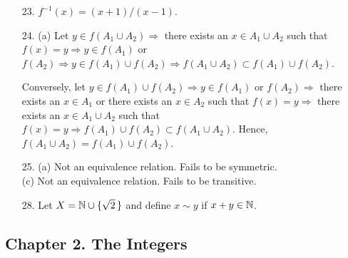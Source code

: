 {\begin{itemize}
\item[23.]
$f^{-1}(x) = (x+1)/(x-1)$.
 
\item[24.]
(a)  Let $y \in f(A_1 \cup A_2) \Rightarrow$ there exists an $x
\in A_1 \cup A_2$ such that $f(x) = y \Rightarrow y \in f(A_1)$ or
$f(A_2) \Rightarrow y \in f(A_1) \cup f(A_2) \Rightarrow f(A_1 \cup A_2)
\subset f(A_1) \cup f(A_2)$.
 
Conversely, let $y \in f(A_1) \cup f(A_2) \Rightarrow y \in f(A_1)$ or
$f(A_2) \Rightarrow$ there exists an $x \in A_1$ or there exists an
$x \in A_2$ such that $f(x) = y \Rightarrow$ there exists an $x \in
A_1 \cup A_2$ such that $f(x) = y \Rightarrow f(A_1) \cup f(A_2)
\subset f(A_1 \cup A_2)$. Hence, $f(A_1 \cup A_2) = f(A_1) \cup f(A_2)$. 
 
\item[25.]
(a) Not an equivalence relation. Fails to be symmetric.\\
(c) Not an equivalence relation. Fails to be transitive.
 
\item[28.]
Let $X = {\Bbb N} \cup \{ \sqrt{2}\, \}$ and define $x \sim y$ if $x + y
\in {\Bbb N}$.
 
\end{itemize}
}
 
 
 
\subsection*{Chapter 2. The Integers}
 

